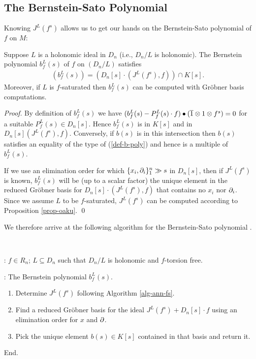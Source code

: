 \subsection{The Bernstein-Sato Polynomial}
Knowing $J^L(f^s)$ allows us to get our hands on the Bernstein-Sato
polynomial of $f$ on $M$:

\begin{corollary}
Suppose $L$ is a holonomic ideal in $D_n$ (i.e., $D_n/L$ is holonomic). 
The
Bernstein polynomial $b_f^L(s)$ of $f$ on $(D_n/L)$ satisfies 
\begin{eqnarray}
(b^L_f(s))=\left(D_n[s]\cdot(J^L(f^s),f)\right)\cap K[s].
\end{eqnarray}
Moreover, if $L$ is $f$-saturated then
$b^L_f(s)$ can be computed with Gr\"obner basis computations.
\end{corollary}

\begin{proof}
By definition of $b^L_f(s)$ we have
$(b_f^L(s)-P_f^L(s)\cdot f)\bullet (\overline{1}\otimes 1\otimes f^s)=0$ for
a suitable $P^L_f(s)\in D_n[s]$. Hence
$b_f^L(s)$ is in $K[s]$ and in 
$D_n[s](J^L(f^s),f)$. Conversely, if $b(s)$ is in this intersection
then $b(s)$ satisfies an equality of the type of (\ref{def-b-poly}) and
hence is a multiple of $b^L_f(s)$.

If we use 
an elimination order for which $\{x_i,\partial_i\}_1^n\gg s$ in $D_n[s]$, then
if $J^L(f^s)$ is known, 
$b^L_f(s)$ will be (up to a scalar 
factor) the unique element in the reduced Gr\"obner basis for
$D_n[s]\cdot (J^L(f^s),f)$ that 
contains no $x_i$ nor $\partial_i$. Since we assume $L$ to be
$f$-saturated,  $J^L(f^s)$ can be computed
according to Proposition \ref{prop-oaku}. 
\qed
\end{proof}

We therefore arrive at the following algorithm for the Bernstein-Sato
polynomial \cite{DM:Oa}.

\begin{alg}~

: $f\in R_n$; $ L\subseteq D_n$ such that 
$D_n/L$ is holonomic and
$f$-torsion free. 

: The Bernstein polynomial $b^L_f(s)$.
\begin{enumerate}
\item Determine $J^L(f^s)$ following Algorithm \ref{alg-ann-fs}. 

\item Find a reduced Gr\"obner basis for the ideal
$J^L(f^s)+D_n[s]\cdot f$ 
using an elimination order for $x$ and $\partial$. 

\item Pick the unique element $b(s)\in K[s]$ contained in that basis and
return it.
\end{enumerate}
End.
\end{alg}

